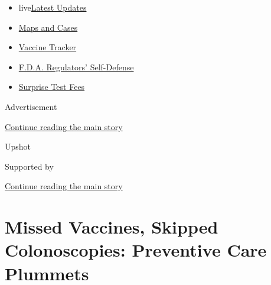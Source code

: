 \begin{itemize}
\tightlist
\item
  live\href{https://www.nytimes3xbfgragh.onion/2020/09/11/world/covid-19-coronavirus.html?name=styln-coronavirus-national\&region=TOP_BANNER\&block=storyline_menu_recirc\&action=click\&pgtype=Article\&impression_id=fcb7adf1-f4b7-11ea-8a93-93f6319b6e62\&variant=undefined}{Latest
  Updates}
\item
  \href{https://www.nytimes3xbfgragh.onion/interactive/2020/us/coronavirus-us-cases.html?name=styln-coronavirus-national\&region=TOP_BANNER\&block=storyline_menu_recirc\&action=click\&pgtype=Article\&impression_id=fcb7adf2-f4b7-11ea-8a93-93f6319b6e62\&variant=undefined}{Maps
  and Cases}
\item
  \href{https://www.nytimes3xbfgragh.onion/interactive/2020/science/coronavirus-vaccine-tracker.html?name=styln-coronavirus-national\&region=TOP_BANNER\&block=storyline_menu_recirc\&action=click\&pgtype=Article\&impression_id=fcb7d500-f4b7-11ea-8a93-93f6319b6e62\&variant=undefined}{Vaccine
  Tracker}
\item
  \href{https://www.nytimes3xbfgragh.onion/2020/09/10/us/politics/fda-coronavirus-vaccine.html?name=styln-coronavirus-national\&region=TOP_BANNER\&block=storyline_menu_recirc\&action=click\&pgtype=Article\&impression_id=fcb7d501-f4b7-11ea-8a93-93f6319b6e62\&variant=undefined}{F.D.A.
  Regulators' Self-Defense}
\item
  \href{https://www.nytimes3xbfgragh.onion/2020/09/09/upshot/coronavirus-surprise-test-fees.html?name=styln-coronavirus-national\&region=TOP_BANNER\&block=storyline_menu_recirc\&action=click\&pgtype=Article\&impression_id=fcb7d502-f4b7-11ea-8a93-93f6319b6e62\&variant=undefined}{Surprise
  Test Fees}
\end{itemize}

Advertisement

\protect\hyperlink{after-top}{Continue reading the main story}

Upshot

Supported by

\protect\hyperlink{after-sponsor}{Continue reading the main story}

\hypertarget{missed-vaccines-skipped-colonoscopies-preventive-care-plummets}{%
\section{Missed Vaccines, Skipped Colonoscopies: Preventive Care
Plummets}\label{missed-vaccines-skipped-colonoscopies-preventive-care-plummets}}

